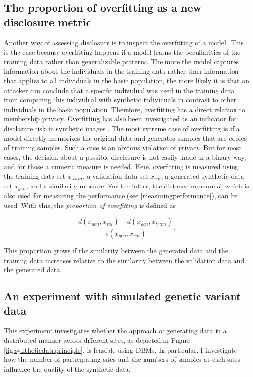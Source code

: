 \documentclass[12pt]{article}
\begin{document}
\subsection{The proportion of overfitting as a new disclosure metric}\label{proportionoverfitting}

Another way of assessing disclosure is to inspect the overfitting of a model.
This is the case because overfitting happens if a model learns the peculiarities of the training data rather than generalizable patterns.
The more the model captures information about the individuals in the training data rather than information that applies to all individuals in the basic population, the more likely it is that an attacker can conclude that a specific individual was used in the training data from comparing this individual with synthetic individuals in contrast to other individuals in the basic population.
Therefore, overfitting has a direct relation to membership privacy.
Overfitting has also been investigated as an indicator for disclosure risk in synthetic images \citep{webster_detecting_2019, hayes_logan_2019}.
The most extreme case of overfitting is if a model directly memorizes the original data and generates samples that are copies of training samples.
Such a case is an obvious violation of privacy.
But for most cases, the decision about a possible disclosure is not easily made in a binary way, and for those a numeric measure is needed.
Here, overfitting is measured using the training data set $x_{train}$, a validation data set $x_{val}$, a generated synthetic data set $x_{gen}$, and a similarity measure.
For the latter, the distance measure $d$, which is also used for measuring the performance (see \ref{measuringperformance}), can be used.
With this, the {\em proportion of overfitting} is defined as

\begin{equation}
\frac{d(x_{gen}, x_{val}) - d(x_{gen}, x_{train})}{d(x_{gen}, x_{val})}.
\end{equation}

This proportion grows if the similarity  between the generated data and the training data increases relative to the similarity between the validation data and the generated data.


\subsection{An experiment with simulated genetic variant data}\label{simuexp}

This experiment investigates whether the approach of generating data in a distributed manner across different sites, as depicted in Figure \ref{fig:syntheticdataprinciple}, is feasible using DBMs.
In particular, I investigate how the number of participating sites and the numbers of samples at each sites influence the quality of the synthetic data.
\end{document}
